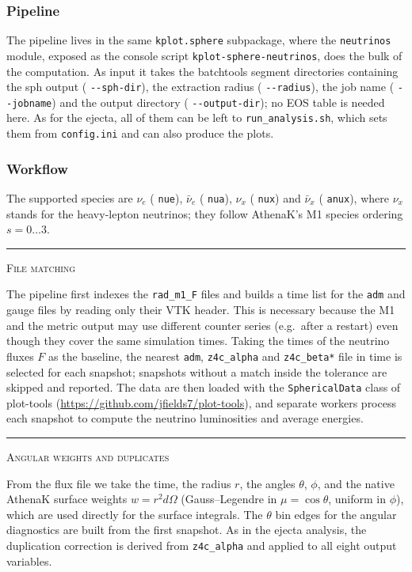 \documentclass{article}
\newcommand{\var}[1]{%
  {\setlength{\fboxsep}{1.5pt}%
   \colorbox{varbg}{\textcolor{varfg}{\texttt{\small #1}}}}}
\newcommand{\step}[1]{%
  \par\medskip\noindent
  {\color{stepfg}\rule[-0.15ex]{2pt}{1.5ex}\hspace{0.5em}\scshape #1}%
  \hspace{0.75em}\ignorespaces}
\begin{document}
\subsubsection*{Pipeline}
The pipeline lives in the same \var{kplot.sphere} subpackage, where the
\var{neutrinos} module, exposed as the console script \var{kplot-sphere-neutrinos},
does the bulk of the computation. As input it takes the batchtools segment
directories containing the sph output (\var{-{}-sph-dir}), the extraction radius
(\var{-{}-radius}), the job name (\var{-{}-jobname}) and the output directory
(\var{-{}-output-dir}); no EOS table is needed here. As for the ejecta, all of them can
be left to \var{run\_analysis.sh}, which sets them from \var{config.ini} and can also
produce the plots.

\subsubsection*{Workflow}
The supported species are $\nu_e$ (\var{nue}), $\bar{\nu}_e$ (\var{nua}), $\nu_x$
(\var{nux}) and $\bar{\nu}_x$ (\var{anux}), where $\nu_x$ stands for the
heavy-lepton neutrinos; they follow AthenaK's M1 species ordering $s=0\dots3$.

\step{File matching} The pipeline first indexes the \var{rad\_m1\_F} files and
builds a time list for the \var{adm} and gauge files by reading only their VTK
header. This is necessary because the M1 and the metric output may use different
counter series (e.g.\ after a restart) even though they cover the same simulation
times. Taking the times of the neutrino fluxes $F$ as the baseline, the nearest
\var{adm}, \var{z4c\_alpha} and \var{z4c\_beta*} file in time is selected for each
snapshot; snapshots without a match inside the tolerance are skipped and reported.
The data are then loaded with the \var{SphericalData} class of plot-tools
(\url{https://github.com/jfields7/plot-tools}), and separate workers process each
snapshot to compute the neutrino luminosities and average energies.

\step{Angular weights and duplicates} From the flux file we take the time, the
radius $r$, the angles $\theta$, $\phi$, and the native AthenaK surface weights
$w=r^2 d\Omega$ (Gauss--Legendre in $\mu=\cos\theta$, uniform in $\phi$), which are
used directly for the surface integrals. The $\theta$ bin edges for the angular
diagnostics are built from the first snapshot. As in the ejecta analysis, the
duplication correction is derived from \var{z4c\_alpha} and applied to all eight
output variables.
\end{document}
